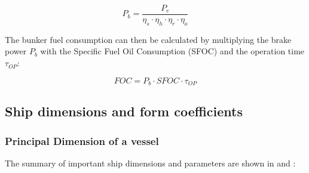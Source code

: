 \begin{equation}\label{eqn:P_b}
    P_b = \frac{P_e}{\eta_s\cdot\eta_h\cdot\eta_r\cdot\eta_o}
\end{equation}

The bunker fuel consumption can then be calculated by multiplying the brake power $P_b$ with the Specific Fuel Oil Consumption (SFOC) and the operation time $\tau_{OP}$:

\begin{equation}\label{eqn:FOC}
    FOC = P_b\cdot SFOC\cdot \tau_{OP} 
\end{equation}

\subsection{Ship dimensions and form coefficients}\label{sec:Ship_design_param}

\subsubsection*{Principal Dimension of a vessel}

The summary of important ship dimensions and parameters are shown in  and  :

